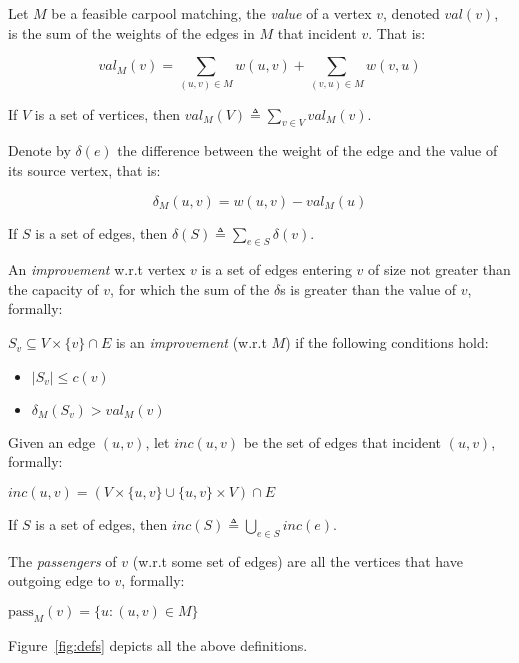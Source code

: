 
Let $M$ be a feasible carpool matching,
the \emph{value} of a vertex $v$, denoted $val(v)$, 
is the sum of the weights of the edges in $M$ that incident $v$. 
That is: 
%
\begin{definition}[$val$]
$$val_M(v) = \sum_{(u, v) \in M} w(u, v) + \sum_{(v, u) \in M} w(v, u)$$
\end{definition}
%
If $V$ is a set of vertices, then $val_M(V) \triangleq \sum_{v \in V} val_M(v)$.

Denote by $\delta(e)$ the difference between the weight of the edge and the value
of its source vertex,
that is:
%
\begin{definition}[$\delta$]
$$\delta_M(u, v) = w(u, v) - val_M(u)$$
\end{definition}
%
If $S$ is a set of edges, then $\delta(S) \triangleq \sum_{e \in S}\delta(v)$.

An \emph{improvement} w.r.t vertex $v$ 
is a set of edges entering $v$ of size not greater than the capacity of $v$, 
for which the sum of the $\delta$s is greater than the value of $v$,
formally: 

\begin{definition}[improvement]
$S_v \subseteq V \times \{v\} \cap E$ is an \emph{improvement} (w.r.t $M$)
if the following conditions hold:
\begin{itemize}
\item
$|S_v| \leq c(v)$
\item
$\delta_M(S_v) > val_M(v)$
\end{itemize}  
\end{definition}

Given an edge $(u,v)$, 
let $inc(u,v)$ be the set of edges that incident $(u, v)$,
formally:

\begin{definition}[inc]
$inc(u,v) = (V \times \{u, v\} \cup \{u, v\} \times V) \cap E$
\end{definition}
%
If $S$ is a set of edges, then $inc(S) \triangleq \bigcup_{e \in S} inc(e)$.

The \emph{passengers} of $v$ (w.r.t some set of edges) are all the vertices that have
outgoing edge to $v$, formally: 

\begin{definition}[passengers]
$\text{pass}_M(v) = \{u : (u, v) \in M\}$
\end{definition}
%
Figure~\ref{fig:defs} depicts all the above definitions.

